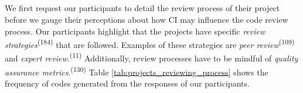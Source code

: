 \subsection*{\textbf{\RQseven}}

We first request our participants to detail the review process of their project before we gauge their perceptions about how CI may influence the code review process.
	Our participants highlight that the projects have specific \textit{review strategies}\textsuperscript{(184)} that are followed. Examples of these strategies are \textit{peer review}\textsuperscript{(109)} and \textit{expert review}.\textsuperscript{(11)} Additionally, review processes have to be mindful of \textit{quality assurance metrics}.\textsuperscript{(130)} Table \ref{tab:projects_reviewing_process} shows the frequency of codes generated from the responses of our participants.

